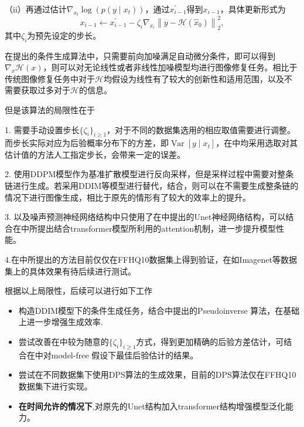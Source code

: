 （ii）再通过估计$\nabla_{x_t}\log(p(y\mid x_t))$，通过$x_{i-1}^{\prime}$得到$x_{i-1}$，具体更新形式为
\begin{equation}
    x_{i-1} \leftarrow x_{i-1}^{\prime}-\zeta_i \nabla_{x_i}\left\|y-\mathcal{H}\left(\hat{x}_0\right)\right\|_2^2, \label{update 2 DPS}
\end{equation}
其中$\zeta_i$为预先设定的步长。

在\cite{Inverse}提出的条件生成算法中，只需要前向加噪满足自动微分条件，即可以得到$\nabla_x\mathcal{H}(x)$，则可以对无论线性或者非线性加噪模型均进行图像修复任务。相比于传统图像修复任务中对于$\mathcal{H}$均假设为线性有了较大的创新性和适用范围，以及不需要获取过多对于$\mathcal{H}$的信息。     

但是该算法的局限性在于      


1. 需要手动设置步长$\{\zeta_i\}_{i\geq 1}$，对于不同的数据集选用的相应取值需要进行调整。 而步长实际对应为后验概率分布下的方差，即$\operatorname{Var}\left[y\mid x_t\right]$，在\cite{song2023pseudoinverse,Inverse}中均采用选取对其估计值的方法人工指定步长，会带来一定的误差。   


2. 使用DDPM模型作为基准扩散模型进行反向采样，但是采样过程中需要对整条链进行生成。若采用DDIM等模型进行替代，结合\cite{DDIM}，则可以在不需要生成整条链的情况下进行图像生成，相比于原先的情形有了较大的效率上的提升。   

3. 以及噪声预测神经网络结构中只使用了在\cite{Unet}中提出的Unet神经网络结构，可以结合在\cite{DDIM,VAE_diffusion}中所提出结合transformer模型所利用的attention机制，进一步提升模型性能。     

4.在\cite{Inverse}中所提出的方法目前仅仅在FFHQ10数据集上得到验证，在如Imagenet等数据集上的具体效果有待后续进行测试。    

根据以上局限性，后续可以进行如下工作
\begin{itemize}
    \item 构造DDIM模型下的条件生成任务，结合\cite{song2023pseudoinverse}中提出的Pseudoinverse 算法，在\cite{Inverse}基础上进一步增强生成效率.
    \item  尝试改善在\cite{Inverse}中较为随意的$\{\zeta_i\}_{i\geq 1}$方式，得到更加精确的后验方差估计，可结合在\cite{Analytic_DPM}中对model-free 假设下最佳后验估计的结果。
    \item 尝试在不同数据集下使用DPS算法的生成效果，目前的DPS算法仅在FFHQ10数据集下进行实现。
    \item \textbf{在时间允许的情况下},对原先的Unet结构加入transformer结构增强模型泛化能力。
    
\end{itemize}
